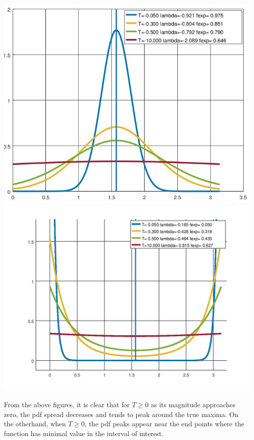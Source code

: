 \documentclass{article}
\begin{document}
\begin{tcolorbox}[fonttitle=\sffamily\bfseries\large,
  title={$sin(x)$} ]
    \centering
     
\end{tcolorbox}

\begin{tcolorbox}[fonttitle=\sffamily\bfseries\large,
  title=Change in pdf with T when $T \le 0$ and $T \ge 0$ ]
     \includegraphics[scale=0.25]{fig1.jpg}
     \hspace{1cm}
     \includegraphics[scale=0.32]{fig2.jpg}
\end{tcolorbox}


From the above figures, it is clear that for $T \ge 0$ as its 
magnitude approaches zero, the pdf spread decreases and
tends to peak around the true maxima. On the otherhand,
when $T \ge 0$, the pdf peaks appear near the end points where
the function has minimal value in the interval of interest. 
\end{document}
